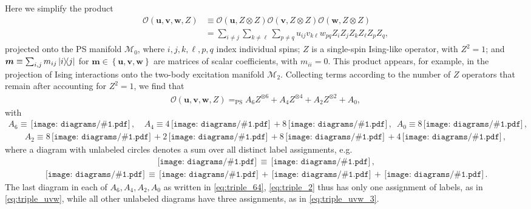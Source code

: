 \documentclass[nofootinbib,notitlepage,11pt]{revtex4-2}
\newcommand{\p}[1]{\left(#1\right)} %
\renewcommand{\set}[1]{\left\{#1\right\}} %
\newcommand{\m}{\bm} %
\newcommand{\1}{\mathds{1}}
\newcommand{\M}{\mathcal{M}}
\renewcommand{\O}{\mathcal{O}}
\newcommand{\EQPS}{=_{\text{PS}}}
\newcommand{\diagram}[1]
{\,\texttt{[image: diagrams/\#1.pdf]}\,}
\begin{document}
Here we simplify the product
\begin{align}
  \O\p{\m u,\m v,\m w,Z}
  &\equiv \O\p{\m u,Z\otimes Z} \O\p{\m v,Z\otimes Z}
  \O\p{\m w,Z\otimes Z} \\
  &= \sum_{i\ne j} \sum_{k\ne\ell} \sum_{p\ne q}
  u_{ij} v_{k\ell} w_{pq} Z_i Z_j Z_k Z_\ell Z_p Z_q,
\end{align}
projected onto the PS manifold $\M_0$, where $i,j,k,\ell,p,q$ index
individual spins; $Z$ is a single-spin Ising-like operator, with
$Z^2=1$; and $\m m\equiv\sum_{i,j} m_{ij}\op{i}{j}$ for
$\m m\in\set{\m u,\m v,\m w}$ are matrices of scalar coefficients,
with $m_{ii}=0$.  This product appears, for example, in the projection
of Ising interactions onto the two-body excitation manifold $\M_2$.
Collecting terms according to the number of $Z$ operators that remain
after accounting for $Z^2=1$, we find that
\begin{align}
  \O\p{\m u,\m v,\m w,Z}
  \EQPS A_6 Z^{\otimes 6} + A_4 Z^{\otimes 4} + A_2 Z^{\otimes 2} + A_0,
  \label{eq:triple_multi}
\end{align}
with
\begin{align}
  A_6 \equiv \diagram{triple_0},
  &&
  A_4 \equiv 4 \diagram{triple_01} + 8 \diagram{triple_1},
  &&
  A_0 \equiv 8 \diagram{triple_0111},
  \label{eq:triple_64}
\end{align}
\begin{align}
  A_2 \equiv 8 \diagram{triple_011} + 2 \diagram{triple_02}
  + 8 \diagram{triple_11} + 4 \diagram{triple_2},
  \label{eq:triple_2}
\end{align}
where a diagram with unlabeled circles denotes a sum over all distinct
label assignments, e.g.
\begin{align}
  \diagram{triple_1} \equiv \diagram{triple_1_uvw},
  \label{eq:triple_uvw}
\end{align}
\begin{align}
  \diagram{triple_011}
  \equiv \diagram{triple_011_uvw}
  + \diagram{triple_011_vwu} + \diagram{triple_011_wuv}.
  \label{eq:triple_uvw_3}
\end{align}
The last diagram in each of $A_6,A_4,A_2,A_0$ as written in
\eqref{eq:triple_64}, \eqref{eq:triple_2} thus has only one assignment
of labels, as in \eqref{eq:triple_uvw}, while all other unlabeled
diagrams have three assignments, as in \eqref{eq:triple_uvw_3}.
\end{document}
